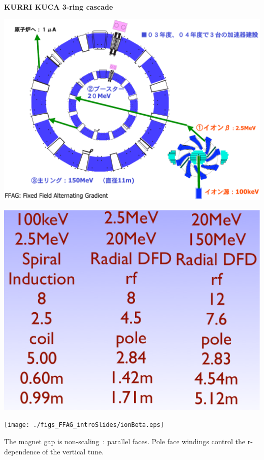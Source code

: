 \documentclass[12pt]{article}
\begin{document}
\clearpage

\begin{minipage}{1.\linewidth}

{\bf \LARGE KURRI KUCA 3-ring cascade}\\[10mm]
\begin{minipage}{.45\linewidth}


\includegraphics[width=.9\linewidth]{./figs_FFAG_introSlides/kurriCascadeSketch.eps}

\vspace{20mm}

\includegraphics[width=.8\linewidth]{./figs_FFAG_introSlides/kurriCascadeParam.eps}

\end{minipage}\hspace{-15mm}
\begin{minipage}{.55\linewidth}

\texttt{[image: ./figs\_FFAG\_introSlides/ionBeta.eps]}

The magnet gap is non-scaling~: parallel faces. Pole face windings control the r-dependence of the vertical tune.

\end{minipage}



\end{minipage}
\end{document}
